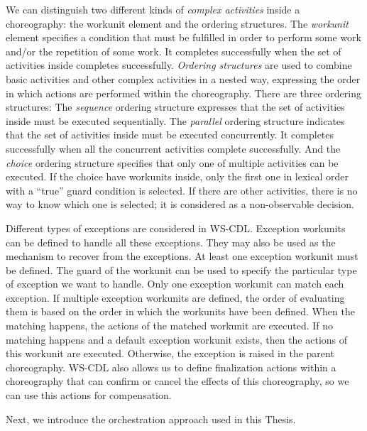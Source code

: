 We can distinguish two different kinds of \textit{complex activities} inside a choreography: the workunit element and the ordering structures. The \textit{workunit} element specifies a condition that must be fulfilled in order to perform some work and/or the repetition of some work. It completes successfully when the set of activities inside completes successfully. \textit{Ordering structures} are used to combine basic activities and other complex activities in a nested way, expressing the order in which actions are performed within the choreography. There are three ordering structures: The \textit{sequence} ordering structure expresses that the set of activities inside must be executed sequentially. The \textit{parallel} ordering structure indicates that the set of activities inside must be executed concurrently. It completes successfully when all the concurrent activities complete successfully. And the \textit{choice} ordering structure specifies that only one of multiple activities can be executed. If the choice have workunits inside, only the first one in lexical order with a ``true'' guard condition is selected. If there are other activities, there is no way to know which one is selected; it is considered as a non-observable decision.

Different types of exceptions are considered in WS-CDL. Exception workunits can be defined to handle all these exceptions. They may also be used as the mechanism to recover from the exceptions. At least one exception workunit must be defined. The guard of the workunit can be used to specify the particular type of exception we want to handle. Only one exception workunit can match each exception. If multiple exception workunits are defined, the order of evaluating them is based on the order in which the workunits have been defined. When the matching happens, the actions of the matched workunit are executed. If no matching happens and a default exception workunit exists, then the actions of this workunit are executed. Otherwise, the exception is raised in the parent choreography. WS-CDL also allows us to define finalization actions within a choreography that can confirm or cancel the effects of this choreography, so we can use this actions for compensation. 

Next, we introduce the orchestration approach used in this Thesis.

